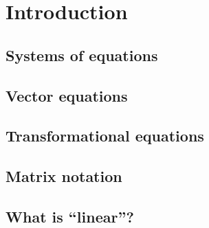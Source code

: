 
\chapter{Introduction}
\label{ch:intro}

\section{Systems of equations}
\label{sec:sys}

\section{Vector equations}
\label{sec:vect}

\section{Transformational equations}
\label{sec:trans}

\section{Matrix notation}
\label{sec:mat}

\section{What is ``linear''?}
\label{sec:what}